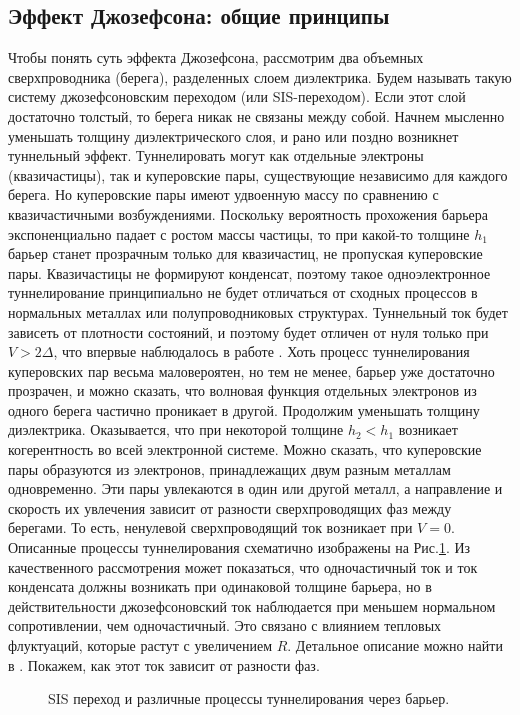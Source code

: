 \subsection{Эффект Джозефсона: общие принципы}
Чтобы понять суть эффекта Джозефсона, рассмотрим два объемных сверхпроводника (берега), разделенных слоем диэлектрика. Будем называть такую систему джозефсоновским переходом (или SIS-переходом). Если этот слой достаточно толстый, то берега никак не связаны между собой. Начнем мысленно уменьшать толщину диэлектрического слоя, и рано или поздно возникнет туннельный эффект. Туннелировать могут как отдельные электроны (квазичастицы), так и куперовские пары, существующие независимо для каждого берега. Но куперовские пары имеют удвоенную массу по сравнению с квазичастичными возбуждениями. Поскольку вероятность прохожения барьера экспоненциально падает с ростом массы частицы, то при какой-то толщине $h_1$ барьер станет прозрачным только для квазичастиц, не пропуская куперовские пары. Квазичастицы не формируют конденсат, поэтому такое одноэлектронное туннелирование принципиально не будет отличаться от сходных процессов в нормальных металлах или полупроводниковых структурах. Туннельный ток будет зависеть от плотности состояний, и поэтому будет отличен от нуля только при $V\!>\!2\Delta$, что впервые наблюдалось в работе \cite{GiaeverGap}. Хоть процесс туннелирования куперовских пар весьма маловероятен, но тем не менее, барьер уже достаточно прозрачен, и можно сказать, что волновая функция отдельных электронов из одного берега частично проникает в другой. Продолжим уменьшать толщину диэлектрика. Оказывается, что при некоторой толщине $h_2\!<\!h_1$ возникает когерентность во всей электронной системе. Можно сказать, что куперовские пары образуются из электронов, принадлежащих двум разным металлам одновременно. Эти пары увлекаются в один или другой металл, а направление и  скорость их увлечения зависит от разности сверхпроводящих фаз между берегами. То есть, ненулевой сверхпроводящий ток возникает при $V\!=\!0$. Описанные процессы туннелирования схематично изображены на Рис.\:\ref{img:jj_tunn}. Из качественного рассмотрения может показаться, что одночастичный ток и ток конденсата должны возникать при одинаковой толщине барьера, но в действительности джозефсоновский ток наблюдается при меньшем нормальном сопротивлении, чем одночастичный. Это связано с влиянием тепловых флуктуаций, которые растут с увеличением $R$. Детальное описание можно найти в \cite{Barone}. Покажем, как этот ток зависит от разности фаз.
\begin{figure}
{\centering 
\hfill
\fontsize{22pt}{22pt}\selectfont
\def\svgwidth{3.5in}%

\hfill
}
\caption{SIS переход и различные процессы туннелирования через барьер.}
\label{img:jj_tunn}
\end{figure}
